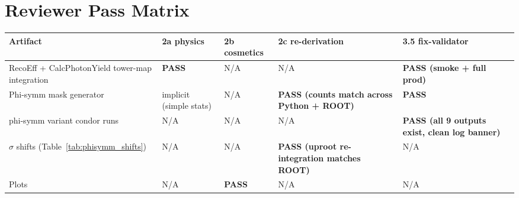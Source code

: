 \documentclass[11pt,a4paper]{article}
\newcommand{\ok}[1]{\textcolor{green!50!black}{\textbf{#1}}}
\begin{document}
\section{Reviewer Pass Matrix}

\begin{longtable}{@{}p{5.2cm}p{2.2cm}p{2.2cm}p{2.5cm}p{2.5cm}@{}}
\toprule
Artifact & 2a physics & 2b cosmetics & 2c re-derivation & 3.5 fix-validator \\
\midrule
RecoEff + CalcPhotonYield tower-map integration & \ok{PASS} & N/A & N/A & \ok{PASS (smoke + full prod)} \\
\addlinespace
Phi-symm mask generator & implicit (simple stats) & N/A & \ok{PASS (counts match across Python + ROOT)} & \ok{PASS} \\
\addlinespace
3 phi-symm variant condor runs & N/A & N/A & N/A & \ok{PASS (all 9 outputs exist, clean log banner)} \\
\addlinespace
$\sigma$ shifts (Table~\ref{tab:phisymm_shifts}) & N/A & N/A & \ok{PASS (uproot re-integration matches ROOT)} & N/A \\
\addlinespace
Plots & N/A & \ok{PASS} & N/A & N/A \\
\bottomrule
\end{longtable}
\end{document}
